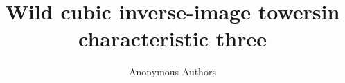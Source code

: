 \documentclass[11pt]{article}
\title{Wild cubic inverse-image towers\newline in characteristic three}
\author{Anonymous Authors}
\date{}
\begin{document}
\maketitle
\begin{abstract}

\end{abstract}










\end{document}
